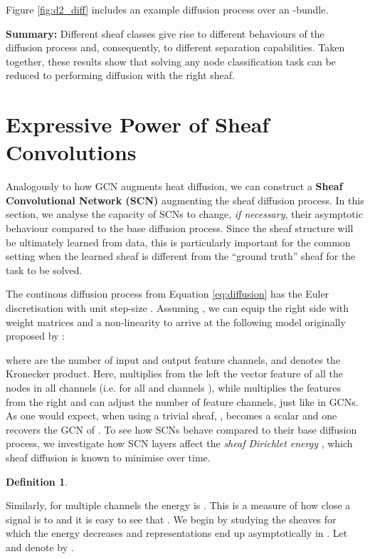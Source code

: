 \documentclass{article}
\newtheorem{definition}[theorem]{Definition}
\begin{document}
Figure \ref{fig:d2_diff} includes an example diffusion process over an -bundle. 


\begin{tcolorbox}[boxsep=0mm,left=2.5mm,right=2.5mm]
\textbf{Summary:} Different sheaf classes give rise to different behaviours of the diffusion process and, consequently, to different separation capabilities. Taken together, these results show that solving any node classification task can be reduced to performing diffusion with the right sheaf.    
\end{tcolorbox}
\vspace{-5pt}

\section{Expressive Power of Sheaf Convolutions}\label{sec:oversmoothing}

Analogously to how GCN augments heat diffusion, we can construct a \textbf{Sheaf Convolutional Network (SCN)} augmenting the sheaf diffusion process. In this section, we analyse the capacity of SCNs to change, \emph{if necessary}, their asymptotic behaviour compared to the base diffusion process. Since the sheaf structure will be ultimately learned from data, this is particularly important for the common setting when the learned sheaf is different from the ``ground truth'' sheaf for the task to be solved.  

The continous diffusion process from Equation \ref{eq:diffusion} has the Euler discretisation with unit step-size .
Assuming , we can equip the right side with weight matrices  and a non-linearity  to arrive at the following model originally proposed by \citet{hansen2020sheaf}:

where  are the number of input and output feature channels, and  denotes the Kronecker product. Here,  multiplies from the left the vector feature of all the nodes in all channels (i.e.  for all  and channels ), while  multiplies the features from the right and can adjust the number of feature channels, just like in GCNs. As one would expect, when using a trivial sheaf, ,  becomes a scalar and one recovers the GCN of \citet{kipf2017graph}. To see how SCNs behave compared to their base diffusion process, we investigate how SCN layers affect the \emph{sheaf Dirichlet energy} , which sheaf diffusion is known to minimise over time. 
\begin{definition}\label{def:energy}

\end{definition}
Similarly, for multiple channels the energy is . This is a measure of how close a signal  is to  and it is easy to see that . We begin by studying the sheaves for which the energy decreases and representations end up asymptotically in . Let  and denote by .  
\end{document}
